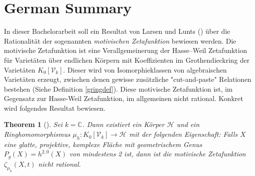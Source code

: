 \documentclass[11pt, a4paper, german, twoside]{article}
\theoremstyle{plain}
\newtheorem{theorem}{Theorem}[section]
\theoremstyle{definition}
\newcommand{\gring}[1][k]{K_0[\mathcal{V}_#1]}
\begin{document}
\section{German Summary}
In dieser Bachelorarbeit soll ein Resultat von Larsen und Lunts (\cite{MR1996804}) über die Rationalität der sogenannten 
\emph{motivischen Zetafunktion}
bewiesen werden. Die motivische Zetafunktion ist eine Verallgemeinerung der Hasse--Weil Zetafunktion für Varietäten über endlichen Körpern
mit Koeffizienten im Grothendieckring der Varietäten $\gring[k]$. Dieser wird von Isomorphieklassen von algebraischen Varietäten erzeugt, 
zwischen denen gewisse zusätzliche "cut-and-paste" Relationen bestehen (Siehe Definition \ref{gringdef}). 
Diese motivische Zetafunktion ist, im Gegensatz zur Hasse-Weil Zetafunktion, im allgemeinen nicht rational. 
Konkret wird folgendes Resultat bewiesen.
\begin{theorem}[{\cite[Thm. 1.6]{MR1996804}}]
Sei $k = \mathbb{C}$. Dann existiert ein Körper $\mathcal{H}$ und ein Ringhomomorphismus $\mu_h \colon \gring \to \mathcal{H}$ mit der folgenden
Eigenschaft: Falls $X$ eine glatte, projektive, komplexe Fläche mit geometrischem Genus $P_g(X) = h^{2,0}(X)$ von mindestens 2 ist, dann ist die
motivische Zetafunktion $\zeta_{\mu_h}(X,t)$ nicht rational.
\end{theorem}

\end{document}
